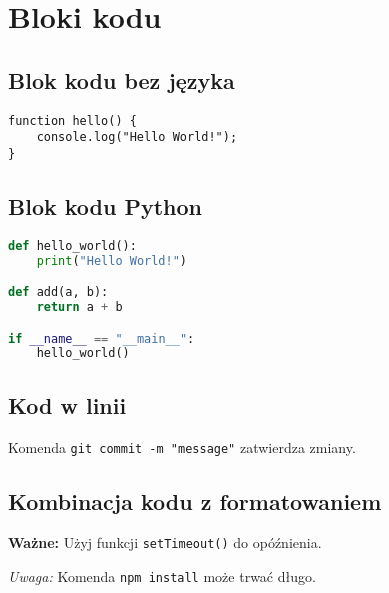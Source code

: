 \documentclass{article}
\begin{document}
\section{Bloki kodu}



\subsection{Blok kodu bez języka}



\begin{lstlisting}[language=text]
function hello() {
    console.log("Hello World!");
}
\end{lstlisting}



\subsection{Blok kodu Python}



\begin{lstlisting}[language=python]
def hello_world():
    print("Hello World!")

def add(a, b):
    return a + b

if __name__ == "__main__":
    hello_world()
\end{lstlisting}



\subsection{Kod w linii}



Komenda \texttt{git commit -m "message"} zatwierdza zmiany.




\subsection{Kombinacja kodu z formatowaniem}



\textbf{Ważne:} Użyj funkcji \texttt{setTimeout()} do opóźnienia.




\textit{Uwaga:} Komenda \texttt{npm install} może trwać długo.
\end{document}
